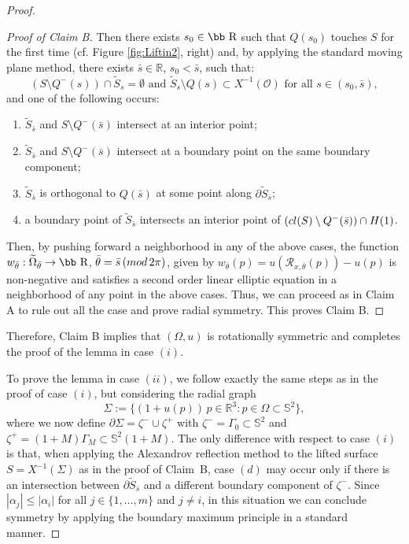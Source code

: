 \documentclass[11pt]{article}
\def\r{\hbox{\bb R}}
\numberwithin{equation} {section}
\begin{document}
\begin{proof}
\begin{proof}[Proof of Claim B]
		Then there exists $s_0 \in \r $ such that $Q(s_0)$ touches $S$ for the first time (cf. Figure \ref{fig:Liftin2}, right) and, by applying the standard moving plane method, there exists $\bar{s} \in \mathbb{R}$, $s_0 < \bar s$, such that:
		$$\left(S \setminus Q^-(s)\right) \cap \widetilde{S}_s = \emptyset \text{ and } \widetilde{S}_s \setminus Q(s) \subset X^{-1}(\mathcal{O}) \text{ for all } s \in (s_0, \bar s),$$
		and one of the following occurs:
		\begin{enumerate}
			\item[(a)] $\widetilde{S}_{\bar{s}}$ and $S \setminus Q^-(\bar{s})$ intersect at an interior point;
			\item[(b)] $\widetilde{S}_{\bar{s}}$ and $S \setminus Q^-(\bar{s})$ intersect at a boundary point on the same boundary component;
			\item[(c)] $\widetilde{S}_{\bar{s}}$ is orthogonal to $Q(\bar{s})$ at some point along $\partial \tilde{S}_{\bar{s}}$; 
			\item[(d)] a boundary point of $\widetilde{S}_{\bar{s}}$ intersects an interior point of $(\textup{cl}(S) \setminus Q^-(\bar{s}) ) \cap H(1)$.
		\end{enumerate}
		
		Then, by pushing forward a neighborhood in any of the above cases, the function $w_{\bar \theta} : \widetilde \Omega _{\bar \theta} \to \r $, $\bar \theta = \bar s \, ({\rm mod} \, 2 \pi)$, given by $w _{\bar \theta} (p) = u (\mathcal R_{x, \bar \theta} (p)) -u (p)$ is non-negative and satisfies a second order linear elliptic equation in a neighborhood of any point in the above cases. Thus, we can proceed as in Claim A to rule out all the case and prove radial symmetry. This proves Claim B.
	\end{proof}
Therefore, Claim B implies that $(\Omega ,u)$ is rotationally symmetric and completes the proof of the lemma in case $(i)$.

To prove the lemma in case $(ii)$, we follow exactly the same steps as in the proof of case $(i)$, but considering the radial graph
\[
\Sigma := \{(1+u(p))\,p \in \mathbb{R}^3 : p \in \Omega \subset \mathbb{S}^2\},
\]
where we now define $\partial \Sigma = \zeta^- \cup \zeta^+$ with $\zeta^- = \Gamma_0 \subset  \mathbb{S}^2$ and $\zeta^+ = (1+M)\Gamma_M \subset \mathbb{S}^2(1+M)$. The only difference with respect to case $(i)$ is that, when applying the Alexandrov reflection method to the lifted surface $S = X^{-1}(\Sigma)$ as in the proof of Claim~B, case $(d)$ may occur only if there is an intersection between $\partial \tilde{S}_{\bar s}$ and a different boundary component of $\zeta^-$. Since $|\alpha _j | \leq |\alpha _i|$ for all $j \in \{1, \ldots , m \}$ and $j \neq i$, in this situation we can conclude symmetry by applying the boundary maximum principle in a standard manner.
\end{proof}
\end{document}

